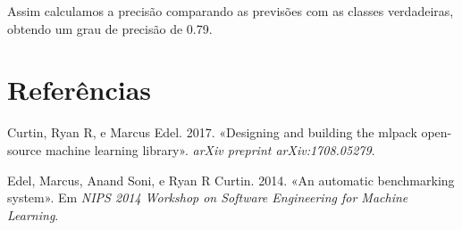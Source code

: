 \documentclass[
  a4paperpaper,
]{article}
\newenvironment{Shaded}{\begin{snugshade}}{\end{snugshade}}
\newcommand{\AttributeTok}[1]{\textcolor[rgb]{0.40,0.45,0.13}{#1}}
\newcommand{\CommentTok}[1]{\textcolor[rgb]{0.37,0.37,0.37}{#1}}
\newcommand{\DecValTok}[1]{\textcolor[rgb]{0.68,0.00,0.00}{#1}}
\newcommand{\FloatTok}[1]{\textcolor[rgb]{0.68,0.00,0.00}{#1}}
\newcommand{\FunctionTok}[1]{\textcolor[rgb]{0.28,0.35,0.67}{#1}}
\newcommand{\NormalTok}[1]{\textcolor[rgb]{0.00,0.23,0.31}{#1}}
\newcommand{\OtherTok}[1]{\textcolor[rgb]{0.00,0.23,0.31}{#1}}
\newcommand{\SpecialCharTok}[1]{\textcolor[rgb]{0.37,0.37,0.37}{#1}}
\newcommand{\StringTok}[1]{\textcolor[rgb]{0.13,0.47,0.30}{#1}}
\newlength{\cslhangindent}
\newenvironment{CSLReferences}[2] %
 {\begin{list}{}{%
  \setlength{\itemindent}{0pt}
  \setlength{\leftmargin}{0pt}
  \setlength{\parsep}{0pt}
  \ifodd #1
   \setlength{\leftmargin}{\cslhangindent}
   \setlength{\itemindent}{-1\cslhangindent}
  \fi
  \setlength{\itemsep}{#2\baselineskip}}}
 {\end{list}}
\begin{document}
\begin{Shaded}
\end{Shaded}

Assim calculamos a precisão comparando as previsões com as classes
verdadeiras, obtendo um grau de precisão de 0.79.

\newpage{}

\section*{Referências}\label{referuxeancias}

\label{refs}
\begin{CSLReferences}{1}{0}
Curtin, Ryan R, e Marcus Edel. 2017. {«Designing and building the mlpack
open-source machine learning library»}. \emph{arXiv preprint
arXiv:1708.05279}.

Edel, Marcus, Anand Soni, e Ryan R Curtin. 2014. {«An automatic
benchmarking system»}. Em \emph{NIPS 2014 Workshop on Software
Engineering for Machine Learning}.

\end{CSLReferences}
\end{document}
